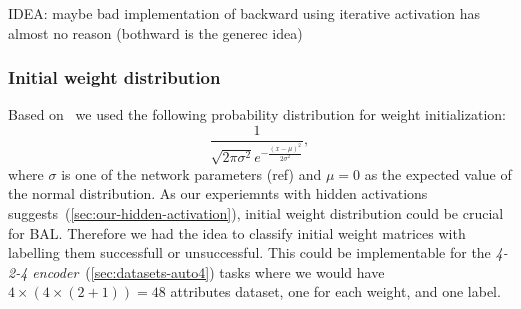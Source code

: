 IDEA: maybe bad implementation of backward
      using iterative activation has almost no reason (bothward is the generec idea) 

\subsubsection*{Initial weight distribution} 
\label{sec:results-sigma} %
\label{sec:our-sigma} 

Based on~\citet{o1996bio} we used the following probability distribution for weight initialization: 
\begin{equation} 
\frac{1}{\sqrt{2\pi \sigma^2} e^{-\frac{(x-\mu)^2}{2\sigma^2}}} \nonumber,
\end{equation} 
where $\sigma$ is one of the network parameters (ref) and $\mu = 0$ as the expected value of the normal distribution. As our experiemnts with hidden activations suggests~(\ref{sec:our-hidden-activation}), initial weight distribution could be crucial for BAL. Therefore we had the idea to classify initial weight matrices with labelling them successfull or unsuccessful. This could be implementable for the \emph{4-2-4 encoder}~(\ref{sec:datasets-auto4}) tasks where we would have $4\times(4\times(2+1))=48$ attributes dataset, one for each weight, and one label.

